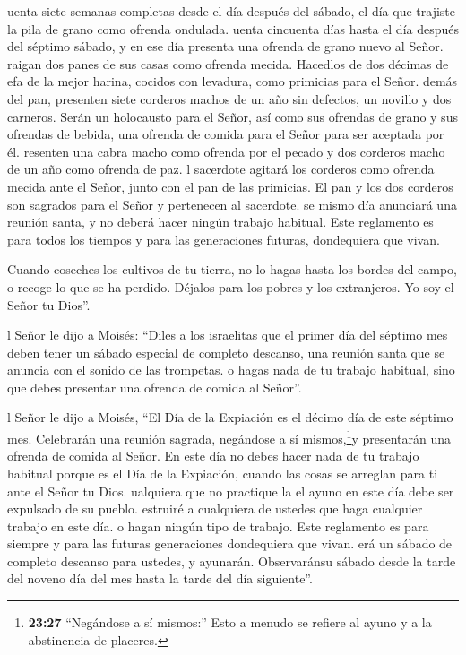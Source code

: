  uenta siete semanas completas desde el día después del
sábado, el día que trajiste la pila de grano como ofrenda ondulada.
 uenta cincuenta días hasta el día después del séptimo
sábado, y en ese día presenta una ofrenda de grano nuevo al Señor.
 raigan dos panes de sus casas como ofrenda mecida.
Hacedlos de dos décimas de efa de la mejor harina, cocidos con levadura,
como primicias para el Señor.  demás del pan, presenten
siete corderos machos de un año sin defectos, un novillo y dos carneros.
Serán un holocausto para el Señor, así como sus ofrendas de grano y sus
ofrendas de bebida, una ofrenda de comida para el Señor para ser
aceptada por él.  resenten una cabra macho como ofrenda por
el pecado y dos corderos macho de un año como ofrenda de paz.
 l sacerdote agitará los corderos como ofrenda mecida ante
el Señor, junto con el pan de las primicias. El pan y los dos corderos
son sagrados para el Señor y pertenecen al sacerdote.  se
mismo día anunciará una reunión santa, y no deberá hacer ningún trabajo
habitual. Este reglamento es para todos los tiempos y para las
generaciones futuras, dondequiera que vivan.

 Cuando coseches los cultivos de tu tierra, no lo hagas
hasta los bordes del campo, o recoge lo que se ha perdido. Déjalos para
los pobres y los extranjeros. Yo soy el Señor tu Dios''.

 l Señor le dijo a Moisés:  ``Diles a los
israelitas que el primer día del séptimo mes deben tener un sábado
especial de completo descanso, una reunión santa que se anuncia con el
sonido de las trompetas.  o hagas nada de tu trabajo
habitual, sino que debes presentar una ofrenda de comida al Señor''.

 l Señor le dijo a Moisés,  ``El Día de la
Expiación es el décimo día de este séptimo mes. Celebrarán una reunión
sagrada, negándose a sí mismos,\footnote{\textbf{23:27} ``Negándose a sí
  mismos:'' Esto a menudo se refiere al ayuno y a la abstinencia de
  placeres.}y presentarán una ofrenda de comida al Señor. 
En este día no debes hacer nada de tu trabajo habitual porque es el Día
de la Expiación, cuando las cosas se arreglan para ti ante el Señor tu
Dios.  ualquiera que no practique la el ayuno en este día
debe ser expulsado de su pueblo.  estruiré a cualquiera de
ustedes que haga cualquier trabajo en este día.  o hagan
ningún tipo de trabajo. Este reglamento es para siempre y para las
futuras generaciones dondequiera que vivan.  erá un sábado
de completo descanso para ustedes, y ayunarán. Observaránsu sábado desde
la tarde del noveno día del mes hasta la tarde del día siguiente''.

